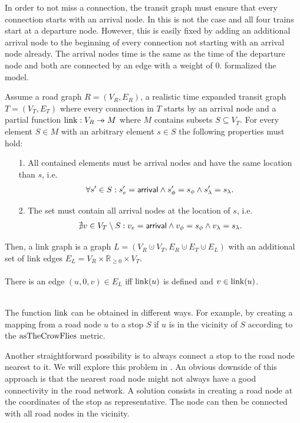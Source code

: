 	In order to not miss a connection, the transit graph must ensure that every connection starts with an arrival node.
	In  this is not the case and all four trains start at a departure node. However,
	this is easily fixed by adding an additional arrival node to the beginning of every connection not starting with an arrival node already.
	The arrival nodes time is the same as the time of the departure node and both are connected by an edge with a weight of $0$.
	 formalized the model.
	\begin{mydef}\label{linkGraph}
		Assume a road graph $R = (V_R, E_R)$, a realistic time expanded transit graph $T = (V_T, E_T)$ where
		every connection in $T$ starts by an arrival node and a partial function $\link: V_R \pto M$ where $M$
		contains subsets $S \subseteq V_T$. For every element $S \in M$ with an arbitrary element $s \in S$ the following
		properties must hold:
		\begin{itemize}
			\item[1.]
				All contained elements must be arrival nodes and have the same location than $s$, i.e.
				\begin{align*}
					\forall s' \in S: s'_e = \textsf{arrival} \land s'_\phi = s_\phi \land s'_\lambda = s_\lambda.
				\end{align*}
			\item[2.]
				The set must contain all arrival nodes at the location of $s$, i.e.
				\begin{align*}
					\nexists v \in V_T \setminus S: v_e = \textsf{arrival} \land v_\phi = s_\phi \land v_\lambda = s_\lambda.
				\end{align*}
		\end{itemize}
		Then, a \textnormal{link graph} is a graph $L = (V_R \cupdot V_T, E_R \cupdot E_T \cupdot E_L)$ with
		an additional set of link edges $E_L = V_R \times \mathbb{R}_{\ge 0} \times V_T$.\\\\
		There is an edge $(u, 0, v) \in E_L$ iff $\operatorname{link}(u)$ is defined and $v \in \operatorname{link}(u)$.
	\end{mydef}\quad\\
	The function $\operatorname{link}$ can be obtained in different ways. For example, by creating a mapping from a road node $u$ to
	a stop $S$ if $u$ is in the vicinity of $S$ according to the $\operatorname{asTheCrowFlies}$ metric.
	
	Another straightforward possibility is to always connect a stop to the road node nearest to it. We will explore
	this problem in . An obvious downside of this approach is that the nearest road node
	might not always have a good connectivity in the road network. A solution consists in creating a road node at the coordinates
	of the stop as representative. The node can then be connected with all road nodes in the vicinity.

